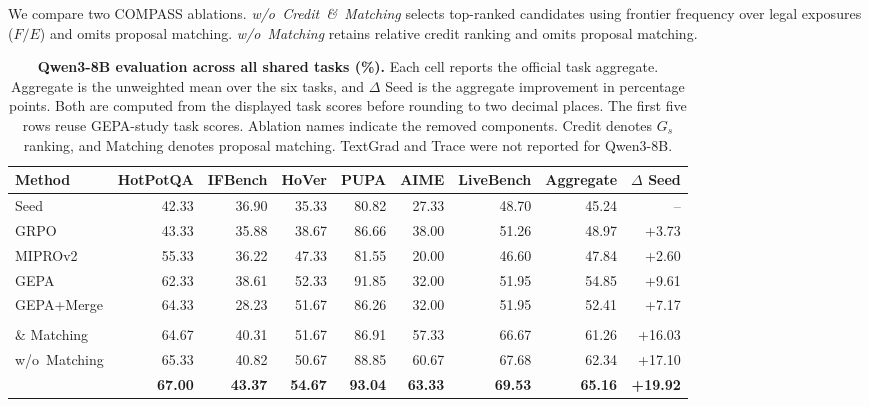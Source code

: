 We compare two COMPASS ablations.  \mbox{\emph{w/o Credit \& Matching}} selects
top-ranked candidates using frontier frequency over legal exposures ($F/E$)
and omits proposal matching.  \mbox{\emph{w/o Matching}} retains relative credit
ranking and omits proposal matching.

\begin{table}[H]
\caption{\textbf{Qwen3-8B evaluation across all shared tasks (\%).}
Each cell reports the official task aggregate.  Aggregate is the unweighted
mean over the six tasks, and $\Delta$ Seed is the aggregate improvement in
percentage points.  Both are computed from the displayed task scores before
rounding to two decimal places.  The first five rows reuse GEPA-study task
scores.  Ablation names indicate the removed components.  Credit denotes
$G_s$ ranking, and Matching denotes proposal matching.
TextGrad and Trace were not reported for Qwen3-8B.}
\label{tab:qwen_results}
\begin{center}
\setlength{\tabcolsep}{3.3pt}
\begin{tabular*}{\linewidth}{@{\extracolsep{\fill}}lrrrrrrrr@{}}
\toprule
Method & HotPotQA & IFBench & HoVer & PUPA & AIME & LiveBench & Aggregate & $\Delta$ Seed \\
\midrule
Seed & 42.33 & 36.90 & 35.33 & 80.82 & 27.33 & 48.70 & 45.24 & -- \\
GRPO & 43.33 & 35.88 & 38.67 & 86.66 & 38.00 & 51.26 & 48.97 & +3.73 \\
MIPROv2 & 55.33 & 36.22 & 47.33 & 81.55 & 20.00 & 46.60 & 47.84 & +2.60 \\
GEPA & 62.33 & 38.61 & 52.33 & 91.85 & 32.00 & 51.95 & 54.85 & +9.61 \\
GEPA+Merge & 64.33 & 28.23 & 51.67 & 86.26 & 32.00 & 51.95 & 52.41 & +7.17 \\
\begin{tabular}[c]{@{}l@{}}w/o~Credit \\ \& Matching\end{tabular} & 64.67 & 40.31 & 51.67 & 86.91 & 57.33 & 66.67 & 61.26 & +16.03 \\
w/o~Matching & 65.33 & 40.82 & 50.67 & 88.85 & 60.67 & 67.68 & 62.34 & +17.10 \\
\method{} & \textbf{67.00} & \textbf{43.37} & \textbf{54.67} & \textbf{93.04} & \textbf{63.33} & \textbf{69.53} & \textbf{65.16} & \textbf{+19.92} \\
\bottomrule
\end{tabular*}
\end{center}
\end{table}

